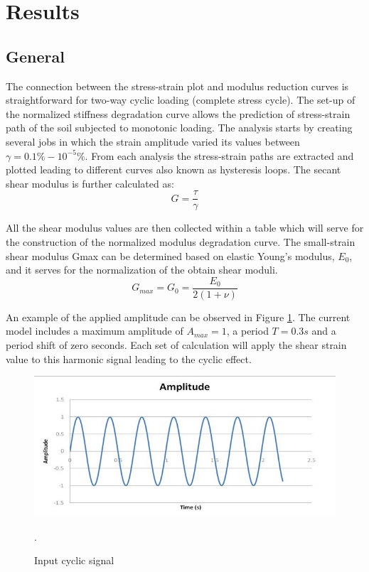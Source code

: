 \documentclass[12pt,a4paper]{report}
\begin{document}
\newpage
\section{Results}
\subsection{General}
The connection between the stress-strain plot and modulus reduction curves is straightforward for two-way cyclic loading (complete stress cycle). The set-up of the normalized stiffness degradation curve allows the prediction of stress-strain path of the soil subjected to monotonic loading. 
The analysis starts by creating several jobs in which the strain amplitude varied its values between $\gamma=0.1\%-10^{-5}\%$. From each analysis the stress-strain paths are extracted and plotted leading to different curves also known as hysteresis loops. The secant shear modulus is further calculated as:
\begin{equation}
	G=\frac{\tau}{\gamma}
\end{equation}

All the shear modulus values are then collected within a table which will serve for the construction of the normalized modulus degradation curve. The small-strain shear modulus Gmax can be determined based on elastic Young's modulus, $E_0$, and it serves for the normalization of the obtain shear moduli. 
\begin{equation}
	G_{max} = G_0=\frac{E_0}{2(1+\nu)}
\end{equation}

An example of the applied amplitude can be observed in Figure \ref{cyclic}. The current model includes a maximum amplitude of $A_{max} = 1$, a period $T=0.3s$ and a period shift of zero seconds. Each set of calculation will apply the shear strain value to this harmonic signal leading to the cyclic effect.

\begin{figure}[h!]
	\centering
	\includegraphics[width=0.7\linewidth]{"cyclicampl"}
	\caption{Input cyclic signal}
	\label{cyclic}.
\end{figure}
\end{document}
